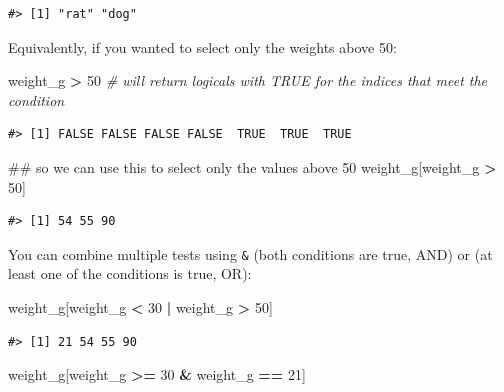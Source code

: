 \documentclass[]{book}
\newenvironment{Shaded}{\begin{snugshade}}{\end{snugshade}}
\newcommand{\DecValTok}[1]{\textcolor[rgb]{0.00,0.00,0.81}{#1}}
\newcommand{\StringTok}[1]{\textcolor[rgb]{0.31,0.60,0.02}{#1}}
\newcommand{\CommentTok}[1]{\textcolor[rgb]{0.56,0.35,0.01}{\textit{#1}}}
\newcommand{\OperatorTok}[1]{\textcolor[rgb]{0.81,0.36,0.00}{\textbf{#1}}}
\newcommand{\NormalTok}[1]{#1}
\theoremstyle{definition}
\theoremstyle{definition}
\theoremstyle{remark}
\begin{document}
\begin{verbatim}
#> [1] "rat" "dog"
\end{verbatim}

Equivalently, if you wanted to select only the weights above 50:

\begin{Shaded}
\begin{Highlighting}[]
\NormalTok{weight_g }\OperatorTok{>}\StringTok{ }\DecValTok{50}    \CommentTok{# will return logicals with TRUE for the indices that meet the condition}
\end{Highlighting}
\end{Shaded}

\begin{verbatim}
#> [1] FALSE FALSE FALSE FALSE  TRUE  TRUE  TRUE
\end{verbatim}

\begin{Shaded}
\begin{Highlighting}[]
\NormalTok{## so we can use this to select only the values above 50}
\NormalTok{weight_g[weight_g }\OperatorTok{>}\StringTok{ }\DecValTok{50}\NormalTok{]}
\end{Highlighting}
\end{Shaded}

\begin{verbatim}
#> [1] 54 55 90
\end{verbatim}

You can combine multiple tests using \texttt{\&} (both conditions are
true, AND) or \texttt{\textbar{}} (at least one of the conditions is
true, OR):

\begin{Shaded}
\begin{Highlighting}[]
\NormalTok{weight_g[weight_g }\OperatorTok{<}\StringTok{ }\DecValTok{30} \OperatorTok{|}\StringTok{ }\NormalTok{weight_g }\OperatorTok{>}\StringTok{ }\DecValTok{50}\NormalTok{]}
\end{Highlighting}
\end{Shaded}

\begin{verbatim}
#> [1] 21 54 55 90
\end{verbatim}

\begin{Shaded}
\begin{Highlighting}[]
\NormalTok{weight_g[weight_g }\OperatorTok{>=}\StringTok{ }\DecValTok{30} \OperatorTok{&}\StringTok{ }\NormalTok{weight_g }\OperatorTok{==}\StringTok{ }\DecValTok{21}\NormalTok{]}
\end{Highlighting}
\end{Shaded}
\end{document}
